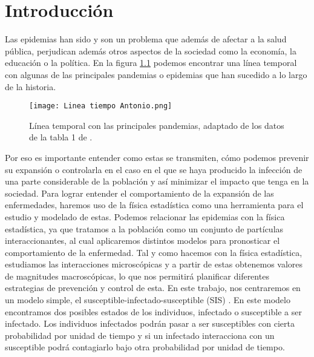 \chapter{Introducción}\label{ch:Introducción}
Las epidemias han sido y son un problema que además de afectar a la salud pública, perjudican además otros aspectos
de la sociedad como la economía, la educación o la política. En la figura \ref{f:linea} podemos encontrar una línea temporal con algunas de las
principales pandemias o epidemias que han sucedido a lo largo de la historia.

\begin{figure}[H]
    \centering
    \texttt{[image: Linea tiempo Antonio.png]}
    \caption{Línea temporal con las principales pandemias, adaptado de los datos de la tabla 1 de \cite{castaneda2020principales}.}
    \label{f:linea}
\end{figure}

Por eso es importante entender como estas se transmiten, cómo podemos prevenir su expansión o controlarla 
en el caso en el que se haya producido la infección de una parte 
considerable de la población y así minimizar el impacto que tenga en la sociedad.
Para lograr entender el comportamiento de la expansión de las enfermedades, haremos uso de la 
física estadística como una herramienta para el estudio y modelado de estas. Podemos relacionar las epidemias con la física estadística, ya que tratamos a la población como un conjunto de partículas interaccionantes, 
al cual aplicaremos distintos modelos para pronosticar el comportamiento de la enfermedad. Tal y como hacemos con la física estadística,
estudiamos las interacciones microscópicas y a partir de estas obtenemos valores de magnitudes macroscópicas, lo que nos permitirá planificar diferentes
estrategias de prevención y control de esta. En este trabajo, nos centraremos en un modelo 
simple, el susceptible-infectado-susceptible (SIS) \cite{Chowell}. En este modelo encontramos dos posibles estados de los individuos,
infectado o susceptible a ser infectado. Los individuos infectados podrán pasar a ser susceptibles con cierta probabilidad por unidad de tiempo
y si un infectado interacciona con un susceptible podrá contagiarlo bajo otra probabilidad por unidad de tiempo. 

